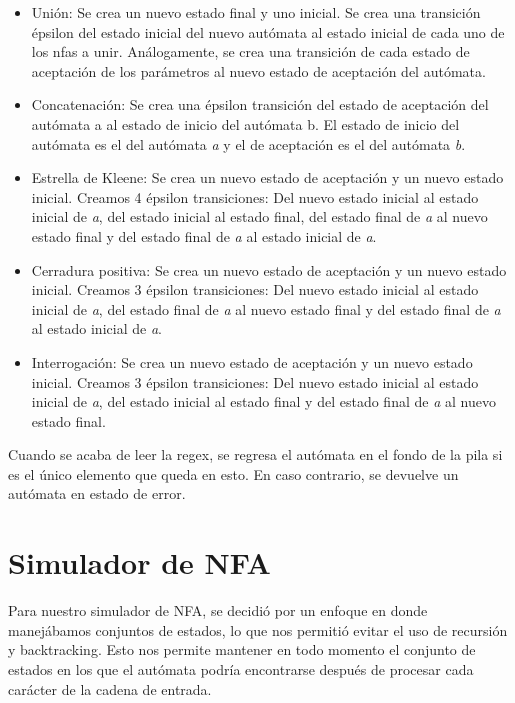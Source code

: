 \documentclass[12pt, letterpaper]{article}
\begin{document}
\begin{itemize}
    \item Unión: Se crea un nuevo estado final y uno inicial. Se crea una transición épsilon del estado inicial del nuevo autómata al estado inicial de cada uno de los nfas a unir. Análogamente, se crea una transición de cada estado de aceptación de los parámetros al nuevo estado de aceptación del autómata.
    \item Concatenación: Se crea una épsilon transición del estado de aceptación del autómata a al estado de inicio del autómata b. El estado de inicio del autómata es el del autómata \textit{a} y el de aceptación es el del autómata \textit{b}.
    \item Estrella de Kleene: Se crea un nuevo estado de aceptación y un nuevo estado inicial. Creamos 4 épsilon transiciones: Del nuevo estado inicial al estado inicial de \textit{a}, del estado inicial al estado final, del estado final de \textit{a} al nuevo estado final y del estado final de \textit{a} al estado inicial de \textit{a}.
    \item Cerradura positiva: Se crea un nuevo estado de aceptación y un nuevo estado inicial. Creamos 3 épsilon transiciones: Del nuevo estado inicial al estado inicial de \textit{a}, del estado final de \textit{a} al nuevo estado final y del estado final de \textit{a} al estado inicial de \textit{a}.
    \item Interrogación: Se crea un nuevo estado de aceptación y un nuevo estado inicial. Creamos 3 épsilon transiciones: Del nuevo estado inicial al estado inicial de \textit{a}, del estado inicial al estado final y del estado final de \textit{a} al nuevo estado final.
\end{itemize}
Cuando se acaba de leer la regex, se regresa el autómata en el fondo de la pila si es el único elemento que queda en esto. En caso contrario, se devuelve un autómata en estado de error. \\

\section{Simulador de NFA} 
\noindent Para nuestro simulador de NFA, se decidió por un enfoque en donde manejábamos conjuntos de estados, lo que nos permitió evitar el uso de recursión y backtracking. Esto nos permite mantener en todo momento el conjunto de estados en los que el autómata podría encontrarse después de procesar cada carácter de la cadena de entrada.\\
\end{document}
